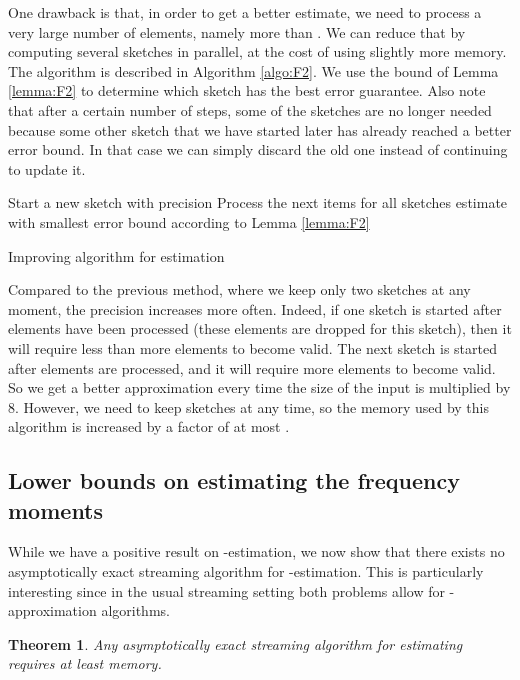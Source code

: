 \documentclass[a4paper,11pt,oneside,english,onecolumn]{article}
\newtheorem{theorem}{Theorem}
\theoremstyle{definition}
\begin{document}
One drawback is that, in order to get a better estimate, we need to process a very large number of elements, namely more than . We can reduce that by computing several sketches in parallel, at the cost of using slightly more memory. The algorithm is described in Algorithm \ref{algo:F2}. We use the bound of Lemma \ref{lemma:F2} to determine which sketch has the best error guarantee. Also note that after a certain number of steps, some of the sketches are no longer needed because some other sketch that we have started later has already reached a better error bound. In that case we can simply discard the old one instead of continuing to update it.

\begin{algorithm}
\DontPrintSemicolon {}
 \;
 {
Start a new sketch with precision \;
  Process the next  items for all sketches \;
   \;
}
\Return estimate with smallest error bound according to Lemma \ref{lemma:F2}\;
\caption{Improving algorithm for  estimation}
\label{algo:F2}
\end{algorithm}

Compared to the previous method, where we keep only two sketches at any moment, the precision increases more often. Indeed, if one sketch is started after  elements have been processed (these elements are dropped for this sketch), then it will require less than  more elements to become valid. The next sketch is started after  elements are processed, and it will require  more elements to become valid. So we get a better approximation every time the size of the input is multiplied by 8. However, we need to keep  sketches at any time, so the memory used by this algorithm is increased by a factor of at most .

\subsection{Lower bounds on estimating the frequency moments}
While we have a positive result on -estimation, we now show that there exists no asymptotically exact streaming algorithm for -estimation. This is particularly interesting since in the usual streaming setting both problems allow for -approximation algorithms.

\begin{theorem}
\label{lem:fzero}
Any asymptotically exact streaming algorithm for estimating  requires at least  memory.
\end{theorem}
\end{document}
